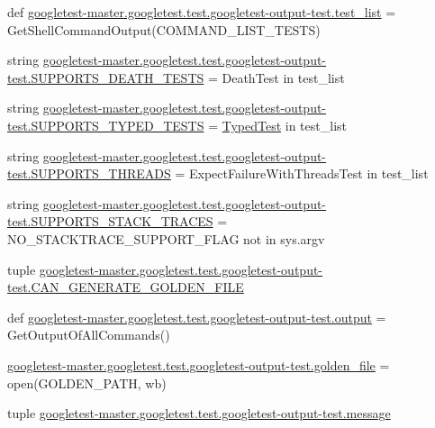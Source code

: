 \begin{DoxyCompactItemize}
\item 
def \mbox{\hyperlink{namespacegoogletest-master_1_1googletest_1_1test_1_1googletest-output-test_a93698fa9205c2bafeaffda6a6aad40c7}{googletest-\/master.\+googletest.\+test.\+googletest-\/output-\/test.\+test\+\_\+list}} = Get\+Shell\+Command\+Output(C\+O\+M\+M\+A\+N\+D\+\_\+\+L\+I\+S\+T\+\_\+\+T\+E\+S\+TS)
\item 
string \mbox{\hyperlink{namespacegoogletest-master_1_1googletest_1_1test_1_1googletest-output-test_ab7a52bcfd53bacc27bf0db84d4077e1a}{googletest-\/master.\+googletest.\+test.\+googletest-\/output-\/test.\+S\+U\+P\+P\+O\+R\+T\+S\+\_\+\+D\+E\+A\+T\+H\+\_\+\+T\+E\+S\+TS}} = \textquotesingle{}Death\+Test\textquotesingle{} in test\+\_\+list
\item 
string \mbox{\hyperlink{namespacegoogletest-master_1_1googletest_1_1test_1_1googletest-output-test_a5dbaeb070a77176882dd38790366e0e9}{googletest-\/master.\+googletest.\+test.\+googletest-\/output-\/test.\+S\+U\+P\+P\+O\+R\+T\+S\+\_\+\+T\+Y\+P\+E\+D\+\_\+\+T\+E\+S\+TS}} = \textquotesingle{}\mbox{\hyperlink{class_typed_test}{Typed\+Test}}\textquotesingle{} in test\+\_\+list
\item 
string \mbox{\hyperlink{namespacegoogletest-master_1_1googletest_1_1test_1_1googletest-output-test_a1113a5326ee787f15e708bff0b066828}{googletest-\/master.\+googletest.\+test.\+googletest-\/output-\/test.\+S\+U\+P\+P\+O\+R\+T\+S\+\_\+\+T\+H\+R\+E\+A\+DS}} = \textquotesingle{}Expect\+Failure\+With\+Threads\+Test\textquotesingle{} in test\+\_\+list
\item 
string \mbox{\hyperlink{namespacegoogletest-master_1_1googletest_1_1test_1_1googletest-output-test_aacbf76d497dcb288b25a766a17b62b69}{googletest-\/master.\+googletest.\+test.\+googletest-\/output-\/test.\+S\+U\+P\+P\+O\+R\+T\+S\+\_\+\+S\+T\+A\+C\+K\+\_\+\+T\+R\+A\+C\+ES}} = N\+O\+\_\+\+S\+T\+A\+C\+K\+T\+R\+A\+C\+E\+\_\+\+S\+U\+P\+P\+O\+R\+T\+\_\+\+F\+L\+AG not in sys.\+argv
\item 
tuple \mbox{\hyperlink{namespacegoogletest-master_1_1googletest_1_1test_1_1googletest-output-test_a8f4e22af5e5dde3fc5056b8753b300d3}{googletest-\/master.\+googletest.\+test.\+googletest-\/output-\/test.\+C\+A\+N\+\_\+\+G\+E\+N\+E\+R\+A\+T\+E\+\_\+\+G\+O\+L\+D\+E\+N\+\_\+\+F\+I\+LE}}
\item 
def \mbox{\hyperlink{namespacegoogletest-master_1_1googletest_1_1test_1_1googletest-output-test_a734f0a5bd94ba038f4350763c6977129}{googletest-\/master.\+googletest.\+test.\+googletest-\/output-\/test.\+output}} = Get\+Output\+Of\+All\+Commands()
\item 
\mbox{\hyperlink{namespacegoogletest-master_1_1googletest_1_1test_1_1googletest-output-test_ab39ac5f20df9b2743df8373744639ff9}{googletest-\/master.\+googletest.\+test.\+googletest-\/output-\/test.\+golden\+\_\+file}} = open(G\+O\+L\+D\+E\+N\+\_\+\+P\+A\+TH, \textquotesingle{}wb\textquotesingle{})
\item 
tuple \mbox{\hyperlink{namespacegoogletest-master_1_1googletest_1_1test_1_1googletest-output-test_a134400907b7ffa228c5e0a3fb1c11dad}{googletest-\/master.\+googletest.\+test.\+googletest-\/output-\/test.\+message}}
\end{DoxyCompactItemize}
